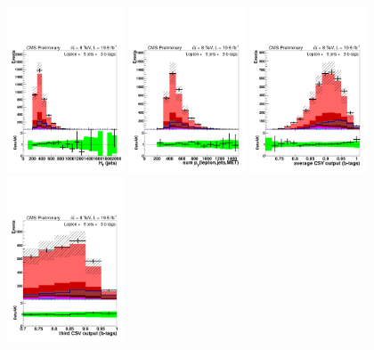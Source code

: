 \begin{figure}[hbtp]
 \begin{center}
   \includegraphics[width=0.31\textwidth]{Figures/Analysis_2_Diagrams/LJ_plots_lep/5j3t/lep_HT_5j3t_cumulative_wRatio_noLegend_lin.pdf}
   \includegraphics[width=0.31\textwidth]{Figures/Analysis_2_Diagrams/LJ_plots_lep/5j3t/lep_all_sum_pt_with_met_5j3t_cumulative_wRatio_noLegend_lin.pdf}
   \includegraphics[width=0.31\textwidth]{Figures/Analysis_2_Diagrams/LJ_plots_lep/5j3t/lep_avg_btag_disc_btags_5j3t_cumulative_wRatio_noLegend_lin.pdf}
   \includegraphics[width=0.31\textwidth]{Figures/Analysis_2_Diagrams/LJ_plots_lep/5j3t/lep_jet_csv_3_5j3t_cumulative_wRatio_noLegend_lin.pdf}

\end{center}
\end{figure}
